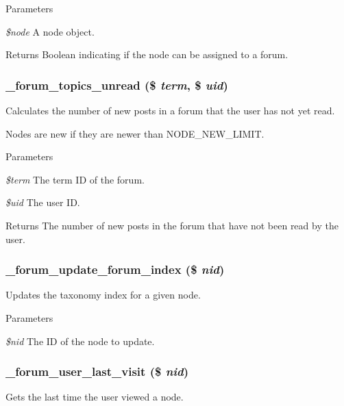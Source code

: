 \begin{DoxyParams}{Parameters}
\item[{\em \$node}]A node object.\end{DoxyParams}
\begin{DoxyReturn}{Returns}
Boolean indicating if the node can be assigned to a forum. 
\end{DoxyReturn}
\hypertarget{forum_8module_ab075ddf90e8f190a8189105743a34dd7}{
\subsubsection[{\_\-forum\_\-topics\_\-unread}]{\setlength{\rightskip}{0pt plus 5cm}\_\-forum\_\-topics\_\-unread (\$ {\em term}, \/  \$ {\em uid})}}
\label{forum_8module_ab075ddf90e8f190a8189105743a34dd7}
Calculates the number of new posts in a forum that the user has not yet read.

Nodes are new if they are newer than NODE\_\-NEW\_\-LIMIT.


\begin{DoxyParams}{Parameters}
\item[{\em \$term}]The term ID of the forum. \item[{\em \$uid}]The user ID.\end{DoxyParams}
\begin{DoxyReturn}{Returns}
The number of new posts in the forum that have not been read by the user. 
\end{DoxyReturn}
\hypertarget{forum_8module_a404d630b1477830133614502f7df323e}{
\subsubsection[{\_\-forum\_\-update\_\-forum\_\-index}]{\setlength{\rightskip}{0pt plus 5cm}\_\-forum\_\-update\_\-forum\_\-index (\$ {\em nid})}}
\label{forum_8module_a404d630b1477830133614502f7df323e}
Updates the taxonomy index for a given node.


\begin{DoxyParams}{Parameters}
\item[{\em \$nid}]The ID of the node to update. \end{DoxyParams}
\hypertarget{forum_8module_aac8a356fca212217649b37f9ba2e8318}{
\subsubsection[{\_\-forum\_\-user\_\-last\_\-visit}]{\setlength{\rightskip}{0pt plus 5cm}\_\-forum\_\-user\_\-last\_\-visit (\$ {\em nid})}}
\label{forum_8module_aac8a356fca212217649b37f9ba2e8318}
Gets the last time the user viewed a node.


